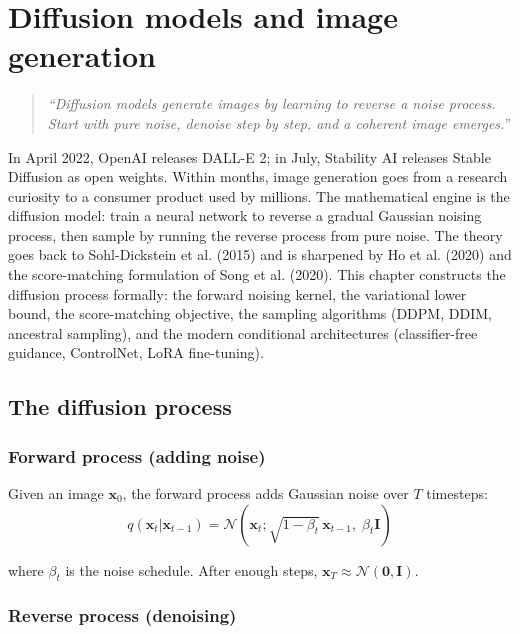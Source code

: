 \chapter{Diffusion models and image generation}
\label{ch:diffusion}

\begin{quote}
\emph{``Diffusion models generate images by learning to reverse a noise process. Start with pure noise, denoise step by step, and a coherent image emerges.''}
\end{quote}

In April 2022, OpenAI releases DALL-E 2; in July, Stability AI releases Stable Diffusion as open weights. Within months, image generation goes from a research curiosity to a consumer product used by millions. The mathematical engine is the diffusion model: train a neural network to reverse a gradual Gaussian noising process, then sample by running the reverse process from pure noise. The theory goes back to Sohl-Dickstein et al. (2015) and is sharpened by Ho et al. (2020) and the score-matching formulation of Song et al. (2020). This chapter constructs the diffusion process formally: the forward noising kernel, the variational lower bound, the score-matching objective, the sampling algorithms (DDPM, DDIM, ancestral sampling), and the modern conditional architectures (classifier-free guidance, ControlNet, LoRA fine-tuning).

\section{The diffusion process}

\subsection{Forward process (adding noise)}

Given an image $\mathbf{x}_0$, the forward process adds Gaussian noise over $T$ timesteps:
\[
q(\mathbf{x}_t | \mathbf{x}_{t-1}) = \mathcal{N}(\mathbf{x}_t; \sqrt{1-\beta_t}\,\mathbf{x}_{t-1},\; \beta_t \mathbf{I})
\]

where $\beta_t$ is the noise schedule. After enough steps, $\mathbf{x}_T \approx \mathcal{N}(\mathbf{0}, \mathbf{I})$.

\subsection{Reverse process (denoising)}

